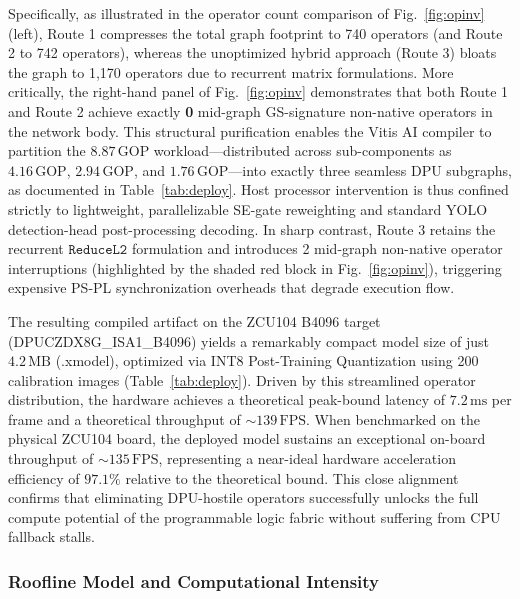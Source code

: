 \documentclass[algorithms,article,submit,moreauthors]{Definitions/mdpi}
\begin{document}
Specifically, as illustrated in the operator count comparison of Fig.~\ref{fig:opinv} (left), Route 1 compresses the total graph footprint to 740 operators (and Route 2 to 742 operators), whereas the unoptimized hybrid approach (Route 3) bloats the graph to 1,170 operators due to recurrent matrix formulations. More critically, the right-hand panel of Fig.~\ref{fig:opinv} demonstrates that both Route 1 and Route 2 achieve exactly \textbf{0} mid-graph GS-signature non-native operators in the network body. This structural purification enables the Vitis AI compiler to partition the $8.87\,\text{GOP}$ workload—distributed across sub-components as $4.16\,\text{GOP}$, $2.94\,\text{GOP}$, and $1.76\,\text{GOP}$—into exactly three seamless DPU subgraphs, as documented in Table~\ref{tab:deploy}. Host processor intervention is thus confined strictly to lightweight, parallelizable SE-gate reweighting and standard YOLO detection-head post-processing decoding. In sharp contrast, Route 3 retains the recurrent $\texttt{ReduceL2}$ formulation and introduces 2 mid-graph non-native operator interruptions (highlighted by the shaded red block in Fig.~\ref{fig:opinv}), triggering expensive PS-PL synchronization overheads that degrade execution flow.

The resulting compiled artifact on the ZCU104 B4096 target (DPUCZDX8G\_ISA1\_B4096) yields a remarkably compact model size of just $4.2\,\text{MB}$ (.xmodel), optimized via INT8 Post-Training Quantization using 200 calibration images (Table~\ref{tab:deploy}). Driven by this streamlined operator distribution, the hardware achieves a theoretical peak-bound latency of $7.2\,\text{ms}$ per frame and a theoretical throughput of $\sim 139\,\text{FPS}$. When benchmarked on the physical ZCU104 board, the deployed model sustains an exceptional on-board throughput of $\sim 135\,\text{FPS}$, representing a near-ideal hardware acceleration efficiency of $97.1\%$ relative to the theoretical bound. This close alignment confirms that eliminating DPU-hostile operators successfully unlocks the full compute potential of the programmable logic fabric without suffering from CPU fallback stalls.

\subsubsection{Roofline Model and Computational Intensity}
\end{document}
